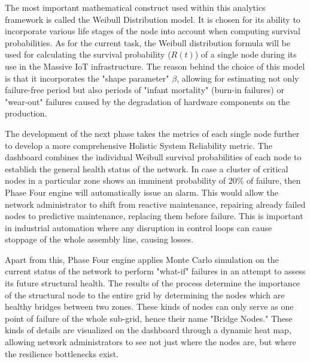 \documentclass[a4paper,fleqn]{cas-dc}
\numberwithin{equation}{section}
\begin{document}
The most important mathematical construct used within this analytics framework is called the Weibull Distribution model. It is chosen for its ability to incorporate various life stages of the node into account when computing survival probabilities. As for the current task, the Weibull distribution formula will be used for calculating the survival probability ($R(t)$) of a single node during its use in the Massive IoT infrastructure. The reason behind the choice of this model is that it incorporates the "shape parameter" $\beta$, allowing for estimating not only failure-free period but also periods of "infant mortality" (burn-in failures) or "wear-out" failures caused by the degradation of hardware components on the production.

The development of the next phase takes the metrics of each single node further to develop a more comprehensive Holistic System Reliability metric. The dashboard combines the individual Weibull survival probabilities of each node to establish the general health status of the network. In case a cluster of critical nodes in a particular zone shows an imminent probability of 20\% of failure, then Phase Four engine will automatically issue an alarm. This would allow the network administrator to shift from reactive maintenance, repairing already failed nodes to predictive maintenance, replacing them before failure. This is important in industrial automation where any disruption in control loops can cause stoppage of the whole assembly line, causing losses. 

Apart from this, Phase Four engine applies Monte Carlo simulation on the current status of the network to perform "what-if" failures in an attempt to assess its future structural health. The results of the process determine the importance of the structural node to the entire grid by determining the nodes which are healthy bridges between two zones. These kinds of nodes can only serve as one point of failure of the whole sub-grid, hence their name "Bridge Nodes." These kinds of details are visualized on the dashboard through a dynamic heat map, allowing network administrators to see not just where the nodes are, but where the resilience bottlenecks exist.
\end{document}
